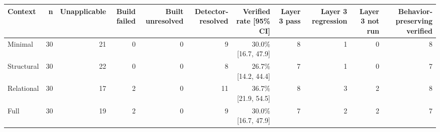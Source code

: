 \begin{tabular}{lrrrrrrrrrr}
\toprule
Context & n & Unapplicable & Build failed & Built unresolved & Detector-resolved & Verified rate [95\% CI] & Layer 3 pass & Layer 3 regression & Layer 3 not run & Behavior-preserving verified \\
\midrule
Minimal & 30 & 21 & 0 & 0 & 9 & 30.0\% [16.7, 47.9] & 8 & 1 & 0 & 8 \\
Structural & 30 & 22 & 0 & 0 & 8 & 26.7\% [14.2, 44.4] & 7 & 1 & 0 & 7 \\
Relational & 30 & 17 & 2 & 0 & 11 & 36.7\% [21.9, 54.5] & 8 & 3 & 2 & 8 \\
Full & 30 & 19 & 2 & 0 & 9 & 30.0\% [16.7, 47.9] & 7 & 2 & 2 & 7 \\
\bottomrule
\end{tabular}
